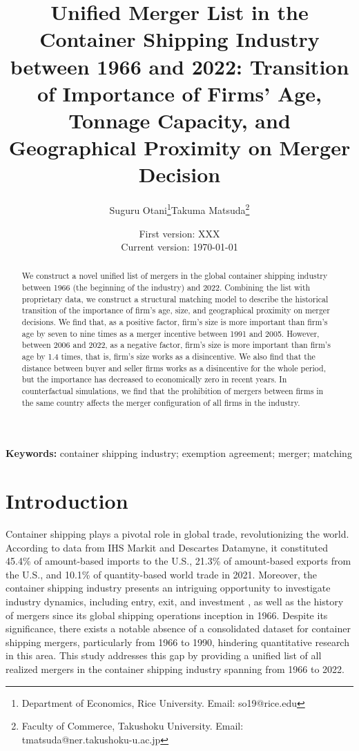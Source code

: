 \documentclass[10pt]{article}
\title{Unified Merger List in the Container Shipping Industry between 1966 and 2022: Transition of Importance of Firms' Age, Tonnage Capacity, and Geographical Proximity on Merger Decision}
\author{Suguru Otani\thanks{Department of Economics, Rice University. Email: so19@rice.edu}\quad  Takuma Matsuda\thanks{Faculty of Commerce, Takushoku University. Email: tmatsuda@ner.takushoku-u.ac.jp}}
\date{
First version: XXX\\
Current version: \today
}
\begin{document}
\maketitle

\begin{abstract}
We construct a novel unified list of mergers in the global container shipping industry between 1966 (the beginning of the industry) and 2022. Combining the list with proprietary data, we construct a structural matching model to describe the historical transition of the importance of firm's age, size, and geographical proximity on merger decisions. 
We find that, as a positive factor, firm's size is more important than firm's age by seven to nine times as a merger incentive between 1991 and 2005.
However, between 2006 and 2022, as a negative factor, firm's size is more important than firm's age by 1.4 times, that is, firm's size works as a disincentive.
We also find that the distance between buyer and seller firms works as a disincentive for the whole period, but the importance has decreased to economically zero in recent years. 
In counterfactual simulations, we find that the prohibition of mergers between firms in the same country affects the merger configuration of all firms in the industry.
\end{abstract} 

\vspace{0.1in}
\noindent\textbf{Keywords:} container shipping industry; exemption agreement;  merger; matching 
\vspace{0in}


\section{Introduction}

Container shipping plays a pivotal role in global trade, revolutionizing the world. According to data from IHS Markit and Descartes Datamyne, it constituted 45.4\% of amount-based imports to the U.S., 21.3\% of amount-based exports from the U.S., and 10.1\% of quantity-based world trade in 2021.
Moreover, the container shipping industry presents an intriguing opportunity to investigate industry dynamics, including entry, exit, and investment \citep{otani2023industry}, as well as the history of mergers since its global shipping operations inception in 1966.
Despite its significance, there exists a notable absence of a consolidated dataset for container shipping mergers, particularly from 1966 to 1990, hindering quantitative research in this area. 
This study addresses this gap by providing a unified list of all realized mergers in the container shipping industry spanning from 1966 to 2022.
\end{document}
